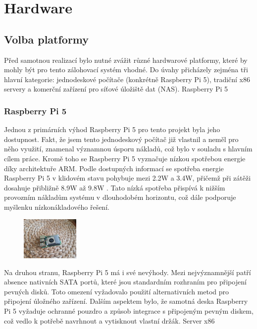 \documentclass[a4paper,12pt, oneside]{book}
\begin{document}
\chapter{Hardware}
\section{Volba platformy}

Před samotnou realizací bylo nutné zvážit různé hardwarové platformy, které by
mohly být pro tento zálohovací systém vhodné. Do úvahy přicházely zejména tři
hlavní kategorie: jednodeskové počítače (konkrétně Raspberry Pi 5), tradiční x86
servery a komerční zařízení pro síťové úložiště dat (NAS). Raspberry Pi 5

\subsection{Raspberry Pi 5}

Jednou z primárních výhod Raspberry Pi 5 pro tento projekt byla jeho dostupnost.
Fakt, že jsem tento jednodeskový počítač již vlastnil a neměl pro něho využití,
znamenal významnou úsporu nákladů, což bylo v souladu s hlavním cílem
práce. Kromě toho se Raspberry Pi 5 vyznačuje nízkou spotřebou energie díky
architektuře ARM. Podle dostupných informací se spotřeba energie Raspberry Pi 5
v klidovém stavu pohybuje mezi 2.2W a 3.4W, přičemž při zátěži dosahuje
přibližně 8.9W až 9.8W . Tato nízká spotřeba přispívá k nižším provozním
nákladům systému v dlouhodobém horizontu, což dále podporuje myšlenku
nízkonákladového řešení.  

\begin{figure}
	\centering
	\includegraphics[width=0.25\textwidth]{img/rpi5-active-cooler.jpg}
\end{figure}

Na druhou stranu, Raspberry Pi 5 má i své nevýhody. Mezi nejvýznamnější patří
absence nativních SATA portů, které jsou standardním rozhraním pro připojení
pevných disků. Toto omezení vyžadovalo použití alternativních metod pro
připojení úložného zařízení. Dalším aspektem bylo, že samotná deska Raspberry Pi
5 vyžaduje ochranné pouzdro a způsob integrace s připojeným pevným diskem, což
vedlo k potřebě navrhnout a vytisknout vlastní držák. Server x86
\end{document}
